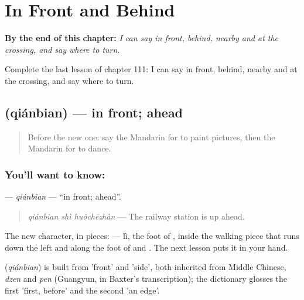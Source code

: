 
\chapter{In Front and Behind}
\label{ch:zh-in-front-and-behind}

\begin{chapteropening}
\textbf{By the end of this chapter:} \emph{I can say in front, behind, nearby and at the crossing, and say where to turn.}

Complete the last lesson of chapter 111: I can say in front, behind, nearby and at the crossing, and say where to turn.
\end{chapteropening}

\section[\texorpdfstring{\zh{前边} (qiánbian)}{前边 (qiánbian)}]{ (qiánbian) — in front; ahead}

\label{lesson:ZH-C111-qianbian}



\begin{quote}
Before the new one: say the Mandarin for to paint pictures, then the Mandarin for to dance.
\end{quote}

\subsection*{You'll want to know: }
\textbf{} — \emph{qiánbian} — \textquotedblleft{}in front; ahead\textquotedblright{}.

\begin{quote}
\textbf{} \emph{qiánbian shì huǒchēzhàn} — The railway station is up ahead.
\end{quote}

The new character, in pieces:  — lì, the foot of , inside the walking piece that runs down the left and along the foot of  and . The next lesson puts it in your hand.

\begin{cousinweb}
\textbf{} (\emph{qiánbian}) is built from  'front' and  'side', both inherited from Middle Chinese, \emph{dzen} and \emph{pen} (Guangyun, in Baxter's transcription); the dictionary glosses the first 'first, before' and the second 'an edge'.
\end{cousinweb}

